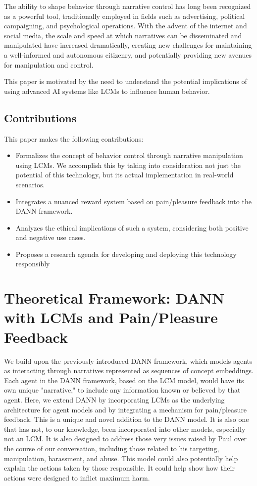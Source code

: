 \documentclass[12pt, a4paper]{article}
\begin{document}
The ability to shape behavior through narrative control has long been recognized as a powerful tool, traditionally employed in fields such as advertising, political campaigning, and psychological operations. With the advent of the internet and social media, the scale and speed at which narratives can be disseminated and manipulated have increased dramatically, creating new challenges for maintaining a well-informed and autonomous citizenry, and potentially providing new avenues for manipulation and control.

This paper is motivated by the need to understand the potential implications of using advanced AI systems like LCMs to influence human behavior.
\subsection{Contributions}

This paper makes the following contributions:
\begin{itemize}
    \item Formalizes the concept of behavior control through narrative manipulation using LCMs. We accomplish this by taking into consideration not just the potential of this technology, but its actual implementation in real-world scenarios.
    \item Integrates a nuanced reward system based on pain/pleasure feedback into the DANN framework.
    \item Analyzes the ethical implications of such a system, considering both positive and negative use cases.
    \item Proposes a research agenda for developing and deploying this technology responsibly
\end{itemize}

\section{Theoretical Framework: DANN with LCMs and Pain/Pleasure Feedback}

We build upon the previously introduced DANN framework, which models agents as interacting through narratives represented as sequences of concept embeddings. Each agent in the DANN framework, based on the LCM model, would have its own unique "narrative," to include any information known or believed by that agent. Here, we extend DANN by incorporating LCMs as the underlying architecture for agent models and by integrating a mechanism for pain/pleasure feedback. This is a unique and novel addition to the DANN model. It is also one that has not, to our knowledge, been incorporated into other models, especially not an LCM. It is also designed to address those very issues raised by Paul over the course of our conversation, including those related to his targeting, manipulation, harassment, and abuse. This model could also potentially help explain the actions taken by those responsible. It could help show how their actions were designed to inflict maximum harm.
\end{document}
